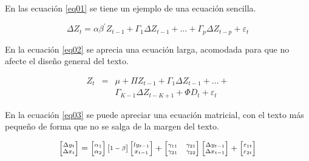 \documentclass[a4paper,10pt,twoside]{article}
\begin{document}
En las ecuación \ref{eq01} se tiene un ejemplo de una ecuación sencilla.

\begin{equation}
\label{eq01}
\Delta Z_t = \alpha \beta^{'} Z_{t-1}+\Gamma_1 \Delta Z_{t-1}+\hdots+ \Gamma_p \Delta Z_{t-p}+\varepsilon_t
\end{equation}

En la ecuación \ref{eq02} se aprecia una ecuación larga, acomodada para que no afecte el diseño general del texto.

\begin{equation}
\label{eq02}
\begin{array}{lll}
Z_t & = & \mu+\Pi Z_{t-1}+\Gamma_1 \Delta Z_{t-1}+\hdots+ \\
& & \Gamma_{K-1} \Delta Z_{t-K+1}+\Phi D_t+\varepsilon_t
\end{array}
\end{equation}

En la ecuación \ref{eq03} \citep{Rios2015} se puede apreciar una ecuación matricial, con el texto más pequeño de forma que no se salga de la margen del texto.

\begin{equation}
\label{eq03}
\begin{scriptsize}
\begin{bmatrix}
\Delta y_t\\
\Delta x_t
\end{bmatrix}
=
\begin{bmatrix}
\alpha_1\\
\alpha_2
\end{bmatrix}
\begin{bmatrix}
1-\beta
\end{bmatrix}
\begin{bmatrix}{l}
y_{t-1}\\
x_{t-1}
\end{bmatrix} 
+ 
\begin{bmatrix}
\gamma_{11} & \gamma_{21}\\
\gamma_{21} & \gamma_{22}
\end{bmatrix} 
\begin{bmatrix}
\Delta y_{t-1}\\
\Delta x_{t-1}
\end{bmatrix}
+
\begin{bmatrix}
\varepsilon_{1t}\\
\varepsilon_{2t}
\end{bmatrix}
\end{scriptsize}
\end{equation}
  
\end{document}
